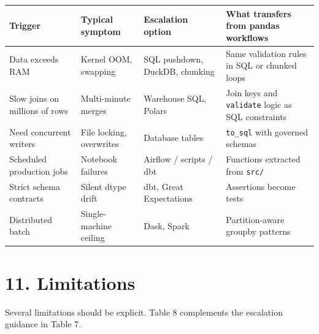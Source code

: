 \documentclass[
  12pt,
]{article}
\newcounter{none} %
\begin{document}
{\def\LTcaptype{none} %
\begin{longtable}[]{@{}
  >{\raggedright\arraybackslash}p{}
  >{\raggedright\arraybackslash}p{}
  >{\raggedright\arraybackslash}p{}
  >{\raggedright\arraybackslash}p{}@{}}
\toprule\noalign{}
\begin{minipage}[b]{\linewidth}\raggedright
Trigger
\end{minipage} & \begin{minipage}[b]{\linewidth}\raggedright
Typical symptom
\end{minipage} & \begin{minipage}[b]{\linewidth}\raggedright
Escalation option
\end{minipage} & \begin{minipage}[b]{\linewidth}\raggedright
What transfers from pandas workflows
\end{minipage} \\
\midrule\noalign{}
\endhead
\bottomrule\noalign{}
\endlastfoot
Data exceeds RAM & Kernel OOM, swapping & SQL pushdown, DuckDB, chunking
& Same validation rules in SQL or chunked loops \\
Slow joins on millions of rows & Multi-minute merges & Warehouse SQL,
Polars & Join keys and \texttt{validate} logic as SQL constraints \\
Need concurrent writers & File locking, overwrites & Database tables &
\texttt{to\_sql} with governed schemas \\
Scheduled production jobs & Notebook failures & Airflow / scripts / dbt
& Functions extracted from \texttt{src/} \\
Strict schema contracts & Silent dtype drift & dbt, Great Expectations &
Assertions become tests \\
Distributed batch & Single-machine ceiling & Dask, Spark &
Partition-aware groupby patterns \\
\end{longtable}
}

\section{11. Limitations}\label{limitations}

Several limitations should be explicit. Table 8 complements the
escalation guidance in Table 7.
\end{document}
